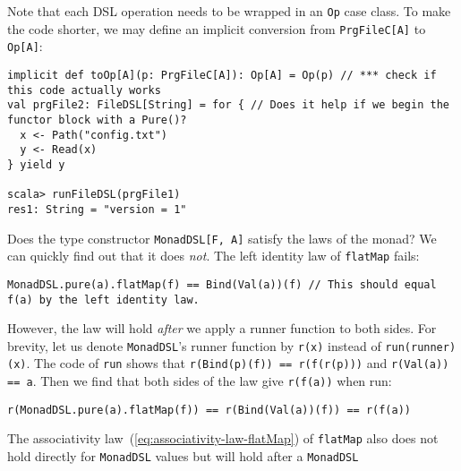Note that each DSL operation needs to be wrapped in an \lstinline!Op!
case class. To make the code shorter, we may define an implicit conversion
from \lstinline!PrgFileC[A]!
to \lstinline!Op[A]!:
\begin{lstlisting}
implicit def toOp[A](p: PrgFileC[A]): Op[A] = Op(p) // *** check if this code actually works
val prgFile2: FileDSL[String] = for { // Does it help if we begin the functor block with a Pure()?
  x <- Path("config.txt")
  y <- Read(x)
} yield y

scala> runFileDSL(prgFile1)
res1: String = "version = 1"
\end{lstlisting}
Does the type constructor \lstinline!MonadDSL[F, A]!
satisfy the laws of the monad? We can quickly find out that it does
\emph{not}. The left identity law of \lstinline!flatMap!
fails:
\begin{lstlisting}
MonadDSL.pure(a).flatMap(f) == Bind(Val(a))(f) // This should equal f(a) by the left identity law.
\end{lstlisting}
However, the law will hold \emph{after} we apply a runner function
to both sides. For brevity, let us denote \lstinline!MonadDSL!\textsf{'}s
runner function by \lstinline!r(x)!
instead of \lstinline!run(runner)(x)!.
The code of \lstinline!run!
shows that \lstinline!r(Bind(p)(f)) == r(f(r(p)))!
and \lstinline!r(Val(a)) == a!.
Then we find that both sides of the law give \lstinline!r(f(a))!
when run:
\begin{lstlisting}
r(MonadDSL.pure(a).flatMap(f)) == r(Bind(Val(a))(f)) == r(f(a))
\end{lstlisting}
The associativity law~(\ref{eq:associativity-law-flatMap}) of \lstinline!flatMap!
also does not hold directly for \lstinline!MonadDSL!
values but will hold after a \lstinline!MonadDSL!
